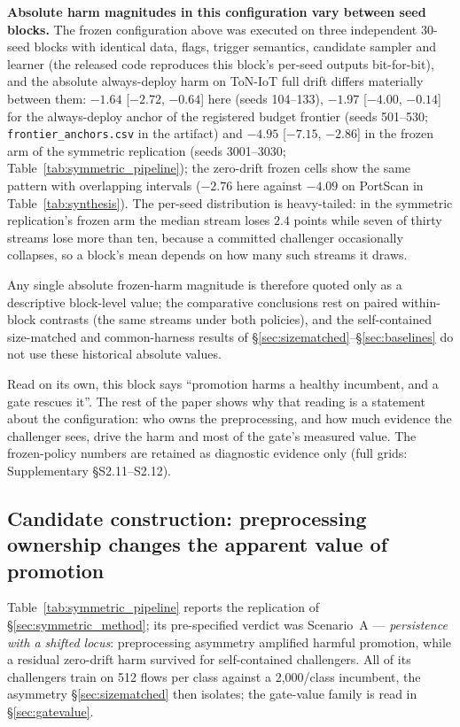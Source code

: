 \documentclass[journal]{IEEEtran}
\begin{document}
\textbf{Absolute harm magnitudes in this configuration vary between seed blocks.} The frozen configuration above was executed on three independent 30-seed blocks with identical data, flags, trigger semantics, candidate sampler and learner (the released code reproduces this block's per-seed outputs bit-for-bit), and the absolute always-deploy harm on ToN-IoT full drift differs materially between them: $-1.64$ [$-2.72$, $-0.64$] here (seeds 104--133), $-1.97$ [$-4.00$, $-0.14$] for the always-deploy anchor of the registered budget frontier (seeds 501--530; \texttt{frontier\_anchors.csv} in the artifact) and $-4.95$ [$-7.15$, $-2.86$] in the frozen arm of the symmetric replication (seeds 3001--3030; Table~\ref{tab:symmetric_pipeline}); the zero-drift frozen cells show the same pattern with overlapping intervals ($-2.76$ here against $-4.09$ on PortScan in Table~\ref{tab:synthesis}). The per-seed distribution is heavy-tailed: in the symmetric replication's frozen arm the median stream loses $2.4$ points while seven of thirty streams lose more than ten, because a committed challenger occasionally collapses, so a block's mean depends on how many such streams it draws.

Any single absolute frozen-harm magnitude is therefore quoted only as a descriptive block-level value; the comparative conclusions rest on paired within-block contrasts (the same streams under both policies), and the self-contained size-matched and common-harness results of \S\ref{sec:sizematched}--\S\ref{sec:baselines} do not use these historical absolute values.

Read on its own, this block says ``promotion harms a healthy incumbent, and a gate rescues it''. The rest of the paper shows why that reading is a statement about the configuration: who owns the preprocessing, and how much evidence the challenger sees, drive the harm and most of the gate's measured value. The frozen-policy numbers are retained as diagnostic evidence only (full grids: Supplementary \S S2.11--S2.12).

\subsection{Candidate construction: preprocessing ownership changes the apparent value of promotion}
\label{sec:symmetric}

Table~\ref{tab:symmetric_pipeline} reports the replication of \S\ref{sec:symmetric_method}; its pre-specified verdict was Scenario~A --- \emph{persistence with a shifted locus}: preprocessing asymmetry amplified harmful promotion, while a residual zero-drift harm survived for self-contained challengers. All of its challengers train on 512 flows per class against a 2{,}000/class incumbent, the asymmetry \S\ref{sec:sizematched} then isolates; the gate-value family is read in \S\ref{sec:gatevalue}.
\end{document}
